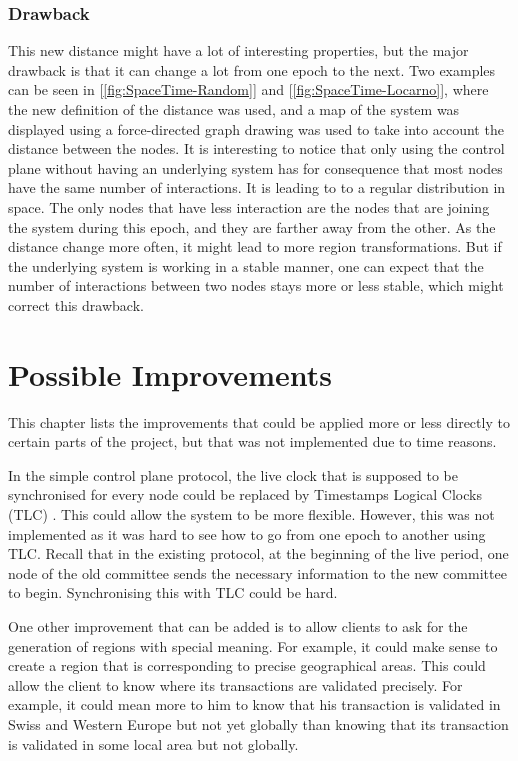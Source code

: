 \documentclass[a4paper,11pt,twoside,openright]{report}
\begin{document}
\subsection{Drawback}
This new distance might have a lot of interesting properties, but the major drawback is that it can change a lot from one epoch to the next. Two examples can be seen in [\autoref{fig:SpaceTime-Random}] and [\autoref{fig:SpaceTime-Locarno}], where the new definition of the distance was used, and a map of the system was displayed using a force-directed graph drawing was used to take into account the distance between the nodes. It is interesting to notice that only using the control plane without having an underlying system has for consequence that most nodes have the same number of interactions. It is leading to to a regular distribution in space. The only nodes that have less interaction are the nodes that are joining the system during this epoch, and they are farther away from the other. As the distance change more often, it might lead to more region transformations. But if the underlying system is working in a stable manner, one can expect that the number of interactions between two nodes stays more or less stable, which might correct this drawback.


\chapter{Possible Improvements} \label{chap:Possible Improvements} %

This chapter lists the improvements that could be applied more or less directly
to certain parts of the project, but that was not implemented due to time reasons. 

In the simple control plane protocol, the live clock that is supposed to be
synchronised for every node could be replaced by Timestamps Logical Clocks (TLC)
\cite{Ford2019}. This could allow the system to be more flexible.
However, this was not implemented as it was hard to see how to go from one
epoch to another using TLC. Recall that in the existing protocol, at the
beginning of the live period, one node of the old committee sends the necessary
information to the new committee to begin. Synchronising this with TLC could be hard.

One other improvement that can be added is to allow clients to ask for the
generation of regions with special meaning. For example, it could make sense to
create a region that is corresponding to precise geographical areas. This could
allow the client to know where its transactions are validated precisely. For
example, it could mean more to him to know that his transaction is validated in
Swiss and Western Europe but not yet globally than knowing that its transaction
is validated in some local area but not globally. 
\end{document}
